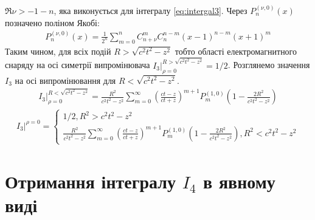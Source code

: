 $ \Re \nu > - 1 - n $, яка виконується для інтегралу \eqref{eq:intergal3}. 
Через $ P_n^{(\nu,0)} (x) $ позначено поліном Якобі:
%
\begin{equation*} \begin{aligned}
P_n^{(\nu,0)} (x) = \frac{1}{2^n} \sum_{m=0}^{n} C_{n+\nu}^{m} C_{n}^{n-m} 
\left( x - 1 \right)^{n-m} \left( x + 1 \right)^m 
\end{aligned} \end{equation*}
%
Таким чином, для всіх подій $ R > \sqrt{c^2 t^2 - z^2} $ тобто області 
електромагнитного снаряду на осі симетрії випромінювача 
$ \left. I_3 \right|_{\rho = 0}^{R > \sqrt{c^2 t^2 - z^2}} = 1/2 $. Розглянемо 
значення $ I_3 $ на осі випромінювання для $ R < \sqrt{c^2 t^2 - z^2} $.
%
%
\begin{equation*} \begin{aligned}
\left. I_3 \right|_{\rho = 0}^{R < \sqrt{c^2 t^2 - z^2}} = 
\frac{R^2}{c^2 t^2 - z^2} \sum_{m=0}^{\infty} 
\left( \frac{ct - z}{ct + z} \right)^{m+1} P_{m}^{(1,0)} 
\left( 1 - \frac{2R^2}{c^2 t^2 - z^2} \right)
\end{aligned} \end{equation*}
%
\begin{equation} \begin{aligned} \label{eq:i3onaxis}
\left. I_3 \right|^{\rho = 0} = \begin{cases} 1/2, R^2 > c^2 t^2 - z^2 \\
\frac{R^2}{c^2 t^2 - z^2} \sum_{m=0}^{\infty} 
\left( \frac{ct - z}{ct + z} \right)^{m+1} P_{m}^{(1,0)} 
\left( 1 - \frac{2R^2}{c^2 t^2 - z^2} \right), 
R^2 < c^2 t^2 - z^2 \end{cases}
\end{aligned} \end{equation}

\section{Отримання інтегралу $ I_4 $ в явному виді}

